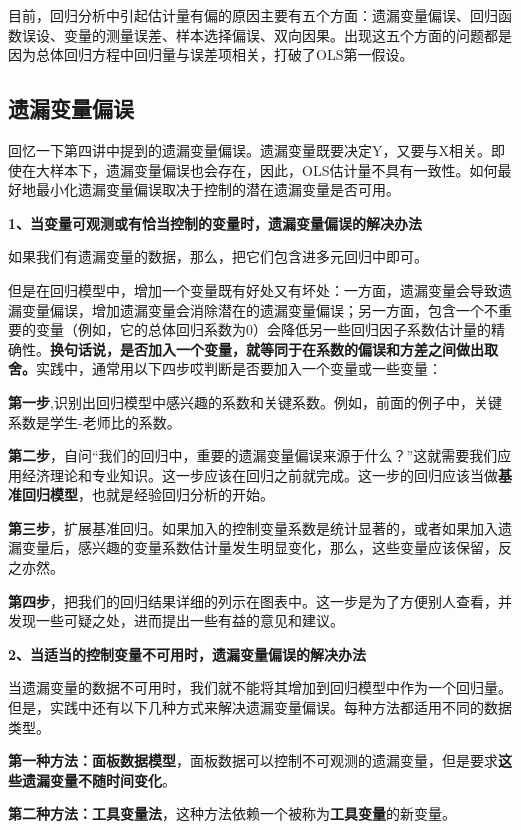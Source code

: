 \documentclass[cn,10pt,math=newtx,citestyle=gb7714-2015,bibstyle=gb7714-2015]{elegantbook}
\begin{document}
目前，回归分析中引起估计量有偏的原因主要有五个方面：遗漏变量偏误、回归函数误设、变量的测量误差、样本选择偏误、双向因果。出现这五个方面的问题都是因为总体回归方程中回归量与误差项相关，打破了OLS第一假设。

\subsection{遗漏变量偏误}
回忆一下第四讲中提到的遗漏变量偏误。遗漏变量既要决定Y，又要与X相关。即使在大样本下，遗漏变量偏误也会存在，因此，OLS估计量不具有一致性。如何最好地最小化遗漏变量偏误取决于控制的潜在遗漏变量是否可用。

\textbf{1、当变量可观测或有恰当控制的变量时，遗漏变量偏误的解决办法}

如果我们有遗漏变量的数据，那么，把它们包含进多元回归中即可。

但是在回归模型中，增加一个变量既有好处又有坏处：一方面，遗漏变量会导致遗漏变量偏误，增加遗漏变量会消除潜在的遗漏变量偏误；另一方面，包含一个不重要的变量（例如，它的总体回归系数为0）会降低另一些回归因子系数估计量的精确性。\textbf{换句话说，是否加入一个变量，就等同于在系数的偏误和方差之间做出取舍。}实践中，通常用以下四步哎判断是否要加入一个变量或一些变量：

\textbf{第一步},识别出回归模型中感兴趣的系数和关键系数。例如，前面的例子中，关键系数是学生-老师比的系数。

\textbf{第二步}，自问“我们的回归中，重要的遗漏变量偏误来源于什么？”这就需要我们应用经济理论和专业知识。这一步应该在回归之前就完成。这一步的回归应该当做\textbf{基准回归模型}，也就是经验回归分析的开始。

\textbf{第三步}，扩展基准回归。如果加入的控制变量系数是统计显著的，或者如果加入遗漏变量后，感兴趣的变量系数估计量发生明显变化，那么，这些变量应该保留，反之亦然。

\textbf{第四步}，把我们的回归结果详细的列示在图表中。这一步是为了方便别人查看，并发现一些可疑之处，进而提出一些有益的意见和建议。

\textbf{2、当适当的控制变量不可用时，遗漏变量偏误的解决办法}

当遗漏变量的数据不可用时，我们就不能将其增加到回归模型中作为一个回归量。但是，实践中还有以下几种方式来解决遗漏变量偏误。每种方法都适用不同的数据类型。

\textbf{第一种方法：面板数据模型}，面板数据可以控制不可观测的遗漏变量，但是要求\textbf{这些遗漏变量不随时间变化}。

\textbf{第二种方法：工具变量法}，这种方法依赖一个被称为\textbf{工具变量}的新变量。
\end{document}
